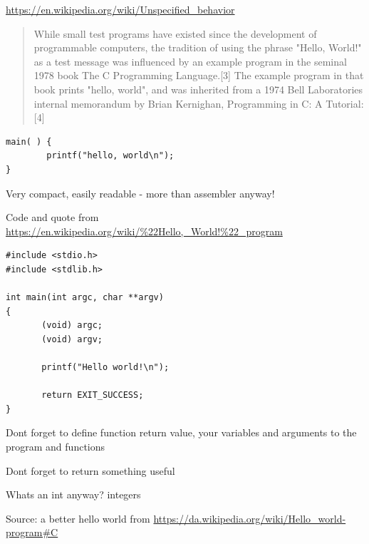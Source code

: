 \documentclass[Screen16to9,17pt]{foils}
\begin{document}
\url{https://en.wikipedia.org/wiki/Unspecified_behavior}





\begin{quote}
While small test programs have existed since the development of programmable computers, the tradition of using the phrase "Hello, World!" as a test message was influenced by an example program in the seminal 1978 book The C Programming Language.[3] The example program in that book prints "hello, world", and was inherited from a 1974 Bell Laboratories internal memorandum by Brian Kernighan, Programming in C: A Tutorial:[4]
\end{quote}

\begin{verbatim}
main( ) {
        printf("hello, world\n");
}
\end{verbatim}

\begin{list2}
\item Very compact, easily readable - more than assembler anyway!
\end{list2}

Code and quote from
\url{https://en.wikipedia.org/wiki/%22Hello,_World!%22_program}


\begin{verbatim}
#include <stdio.h>
#include <stdlib.h>

int main(int argc, char **argv)
{
       (void) argc;
       (void) argv;

       printf("Hello world!\n");

       return EXIT_SUCCESS;
}
\end{verbatim}

\begin{list2}
\item Dont forget to define function return value, your variables and arguments to the program and functions
\item Dont forget to return something useful
\item Whats an int anyway? integers
\end{list2}

Source: a better hello world from \url{https://da.wikipedia.org/wiki/Hello_world-program#C}



\end{document}
